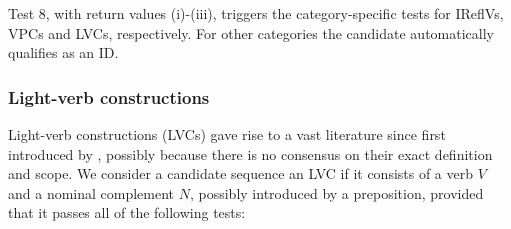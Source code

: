 \documentclass[output=paper,
modfonts,
]{langscibook}
\begin{document}


Test 8, with return values (i)-(iii), triggers the category-specific tests for IReflVs, VPCs and LVCs, respectively. For other categories the candidate automatically qualifies as an ID.

\subsubsection{Light-verb constructions}
\label{sec:lvcs}
%
Light-verb constructions (LVCs) gave rise to a vast literature since first introduced by \citet{jespersen:65}, possibly because there is no consensus on their exact definition and scope. 
%
We consider a candidate sequence an LVC if it consists of a verb $V$ and a nominal complement $N$, possibly introduced by a preposition, provided that it passes all of the following tests:
\end{document}
